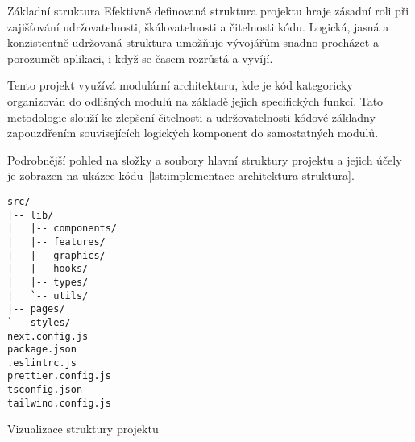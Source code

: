 \begin{subsection}{Základní struktura}
    \label{subsec:implementace-architektura-struktura}
    Efektivně definovaná struktura projektu hraje zásadní roli při zajišťování udržovatelnosti, škálovatelnosti a čitelnosti kódu.
    Logická, jasná a konzistentně udržovaná struktura umožňuje vývojářům snadno procházet a porozumět aplikaci, i když se  časem rozrůstá a vyvíjí.

    Tento projekt využívá modulární architekturu, kde je kód kategoricky organizován do odlišných modulů na základě jejich specifických funkcí.
    Tato metodologie slouží ke zlepšení čitelnosti a udržovatelnosti kódové základny zapouzdřením souvisejících logických komponent do samostatných modulů\cite{p_article_react_folder_structure}.

    Podrobnější pohled na složky a soubory hlavní struktury projektu a jejich účely je zobrazen na ukázce kódu~\ref{lst:implementace-architektura-struktura}.

    \begin{listing}[H]
        \begin{verbatim}
src/
|-- lib/
|   |-- components/
|   |-- features/
|   |-- graphics/
|   |-- hooks/
|   |-- types/
|   `-- utils/
|-- pages/
`-- styles/
next.config.js
package.json
.eslintrc.js
prettier.config.js
tsconfig.json
tailwind.config.js
        \end{verbatim}
        \caption{Vizualizace struktury projektu}
        \label{lst:implementace-architektura-struktura}
    \end{listing}


\end{subsection}

